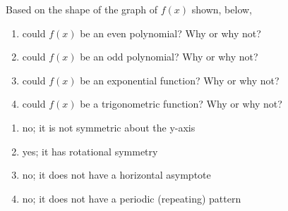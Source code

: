 {Based on the shape of the graph of $f(x)$ shown, below,
\label{fig:01_05_ex_22}
\begin{enumerate}[label=(\alph*)]
\item could $f(x)$ be an even polynomial? Why or why not?
\item could $f(x)$ be an odd polynomial? Why or why not?
\item could $f(x)$ be an exponential function? Why or why not?
\item could $f(x)$ be a trigonometric function? Why or why not?
\end{enumerate}}
{\begin{enumerate}[label=(\alph*)]
	\item no; it is not symmetric about the y-axis
	\item yes; it has rotational symmetry
	\item no; it does not have a horizontal asymptote
	\item no; it does not have a periodic (repeating) pattern
\end{enumerate}}
